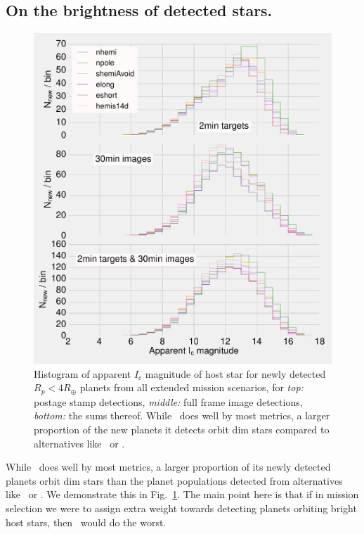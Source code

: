 \subsection{On the brightness of detected stars.}
\begin{figure}[!t]
	\centering
	\includegraphics[]{figures/160729_icmag_t50_all.pdf}
	\caption{Histogram of apparent $I_c$ magnitude of host star for newly detected $R_p<4R_\oplus$ planets from all extended mission scenarios, for \textit{top:} postage stamp detections, \textit{middle:} full frame image detections, \textit{bottom:} the sums thereof.
	While \npole\ does well by most metrics, a larger proportion of the new planets it detects orbit dim stars compared to alternatives like \hemis\ or \shemiAvoid.}
	\label{fig:icmag_meta}
\end{figure}
While \npole\ does well by most metrics, a larger proportion of its newly detected planets orbit dim stars than the planet populations detected from alternatives like \hemis\ or \shemiAvoid.
We demonstrate this in Fig.~\ref{fig:icmag_meta}.
The main point here is that if in mission selection we were to assign extra weight towards detecting planets orbiting bright host stars, then \npole\ would do the worst.
